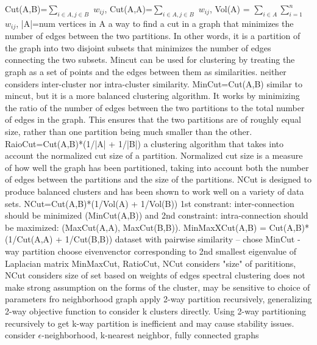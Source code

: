 \documentclass[10pt]{article}
\begin{document}
\NEW    Cut(A,B)=$\sum_{i\in A, j\in B}$ $w_{ij}$, Cut(A,A)=$\sum_{i\in A, j\in B}$ $w_{ij}$, Vol(A) = $\sum_{i\in A}$$\sum_{i=1}^n$ $w_{ij}$, |A|=num vertices in A
\NEW    [MinCut] a way to find a cut in a graph that minimizes the number of edges between the two partitions. In other words, it is a partition of the graph into two disjoint subsets that minimizes the number of edges connecting the two subsets. Mincut can be used for clustering by treating the graph as a set of points and the edges between them as similarities. neither considers inter-cluster nor intra-cluster similarity. MinCut=Cut(A,B)
\NEW    [RatioCut] similar to mincut, but it is a more balanced clustering algorithm. It works by minimizing the ratio of the number of edges between the two partitions to the total number of edges in the graph. This ensures that the two partitions are of roughly equal size, rather than one partition being much smaller than the other. RaioCut=Cut(A,B)*(1/|A| + 1/|B|)
\NEW    [NCut] a clustering algorithm that takes into account the normalized cut size of a partition. Normalized cut size is a measure of how well the graph has been partitioned,
taking into account both the number of edges between the partitions and the size of the partitions. NCut is designed to produce balanced clusters and has been shown to work well on a variety of data sets. NCut=Cut(A,B)*(1/Vol(A) + 1/Vol(B))
\NEW    [MinMaxCut] 1st constrant: inter-connection should be minimized (MinCut(A,B)) and 2nd constraint: intra-connection should be maximized: (MaxCut(A,A), MaxCut(B,B)). MinMaxXCut(A,B) = Cut(A,B)*(1/Cut(A,A) + 1/Cut(B,B))
\NEW    dataset with pairwise similarity -- chose MinCut
-way partition choose eivenvenctor corresponding to 2nd smallest eigenvalue of Laplacian matrix
\NEW    MinMaxCut, RatioCut, NCut considers "size" of parititions, NCut considers size of set based on weights of edges
\NEW    spectral clustering does not make strong assumption on the forms of the cluster, may be sensitive to choice of parameters fro neighborhood graph
 apply 2-way partition recursively, generalizing 2-way objective function to consider k clusters directly.  Using 2-way partitioning recursively to get k-way partition is inefficient and may cause stability issues.
 consider $\epsilon$-neighborhood, k-nearest neighbor, fully connected graphs
\end{document}
